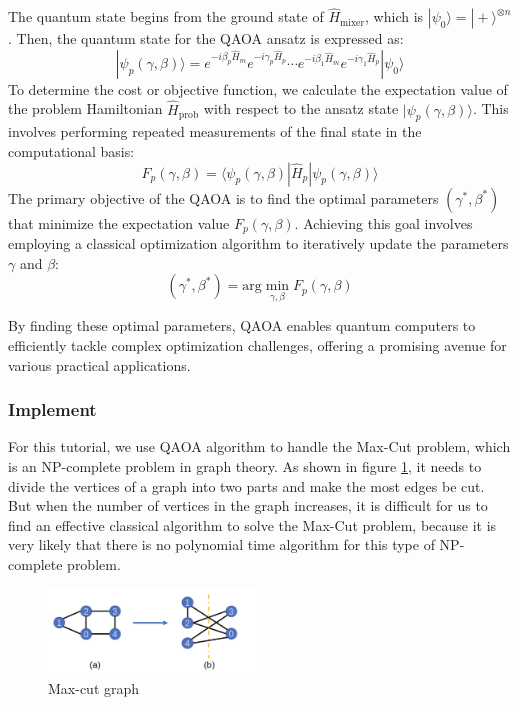 The quantum state begins from the ground state of $\hat{H}_{\text{mixer}}$, which is $|\psi_0\rangle=|+\rangle^{\otimes n}$. Then, the quantum state for the QAOA ansatz is expressed as:
\begin{equation}
|\psi_p(\gamma, \beta)\rangle = e^{-i\beta_p\hat{H}_m}e^{-i\gamma_p\hat{H}_p}\cdots e^{-i\beta_1\hat{H}_{m}}e^{-i\gamma_1\hat{H}_{p}}|\psi_0\rangle
\end{equation}
To determine the cost or objective function, we calculate the expectation value of the problem Hamiltonian $\hat{H}_{\text{prob}}$ with respect to the ansatz state $|\psi_p(\gamma, \beta)\rangle$. This involves performing repeated measurements of the final state in the computational basis:
\begin{equation}
F_p(\gamma, \beta) =\langle\psi_p(\gamma, \beta)|\hat{H}_{p} |\psi_p(\gamma,\beta)\rangle
\end{equation}
The primary objective of the QAOA is to find the optimal parameters $(\gamma^*, \beta^*)$ that minimize the expectation value $F_p(\gamma, \beta)$. Achieving this goal involves employing a classical optimization algorithm to iteratively update the parameters $\gamma$ and $\beta$:
\begin{equation}
(\gamma^*, \beta^*) = \text{arg}\min_{\gamma, \beta} F_p(\gamma, \beta)
\end{equation}

By finding these optimal parameters, QAOA enables quantum computers to efficiently tackle complex optimization challenges, offering a promising avenue for various practical applications.




\subsubsection{Implement}

For this tutorial, we use QAOA algorithm to handle the Max-Cut problem,  which is an NP-complete problem in graph theory. As shown in figure \ref{5.1_QAOA}, it needs to divide the vertices of a graph into two parts and make the most edges be cut. But when the number of vertices in the graph increases, it is difficult for us to find an effective classical algorithm to solve the Max-Cut problem, because it is very likely that there is no polynomial time algorithm for this type of NP-complete problem.
 
\begin{figure}[H]
\centering
\includegraphics[width=0.49\textwidth]{5.2_figures/5.2_QAOA}
\caption{Max-cut graph}
\label{5.1_QAOA}
\end{figure}

